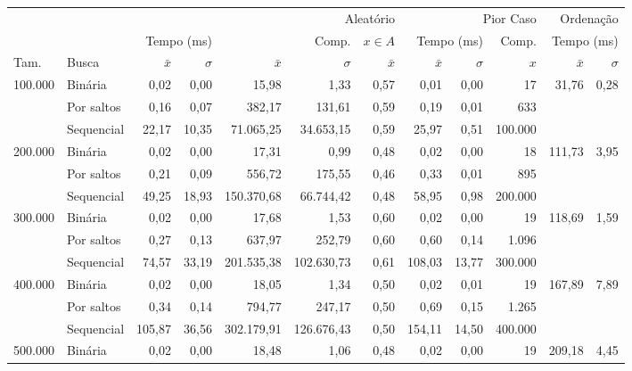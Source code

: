 \begin{tabular}{llrrrrrrrrrr}
\toprule
 &  & \multicolumn{5}{r}{Aleatório} & \multicolumn{3}{r}{Pior Caso} & \multicolumn{2}{r}{Ordenação} \\
 \cmidrule(lr){3-7} \cmidrule(lr){8-10} \cmidrule(lr){11-12}
 &  & \multicolumn{2}{r}{Tempo (ms)} & \multicolumn{2}{r}{Comp.} & $x \in A$ & \multicolumn{2}{r}{Tempo (ms)} & Comp. & \multicolumn{2}{r}{Tempo (ms)} \\
 \cmidrule(lr){3-4} \cmidrule(lr){5-6} \cmidrule(lr){7-7} \cmidrule(lr){8-9} \cmidrule(lr){10-10} \cmidrule(lr){11-12}
 Tam. & Busca & $\bar{x}$ & $\sigma$ & $\bar{x}$ & $\sigma$ & $\bar{x}$ & $\bar{x}$ & $\sigma$ & $x$ & $\bar{x}$ & $\sigma$ \\
\midrule
\multirow[c]{3}{*}{100.000} & Binária & 0,02 & 0,00 & 15,98 & 1,33 & 0,57 & 0,01 & 0,00 & 17 & \multirow[r]{3}{*}{31,76} & \multirow[r]{3}{*}{0,28} \\
 & Por saltos & 0,16 & 0,07 & 382,17 & 131,61 & 0,59 & 0,19 & 0,01 & 633 \\
 & Sequencial & 22,17 & 10,35 & 71.065,25 & 34.653,15 & 0,59 & 25,97 & 0,51 & 100.000 \\
\cline{1-12}
\multirow[c]{3}{*}{200.000} & Binária & 0,02 & 0,00 & 17,31 & 0,99 & 0,48 & 0,02 & 0,00 & 18 & \multirow[r]{3}{*}{111,73} & \multirow[r]{3}{*}{3,95} \\
 & Por saltos & 0,21 & 0,09 & 556,72 & 175,55 & 0,46 & 0,33 & 0,01 & 895 \\
 & Sequencial & 49,25 & 18,93 & 150.370,68 & 66.744,42 & 0,48 & 58,95 & 0,98 & 200.000 \\
\cline{1-12}
\multirow[c]{3}{*}{300.000} & Binária & 0,02 & 0,00 & 17,68 & 1,53 & 0,60 & 0,02 & 0,00 & 19 & \multirow[r]{3}{*}{118,69} & \multirow[r]{3}{*}{1,59} \\
 & Por saltos & 0,27 & 0,13 & 637,97 & 252,79 & 0,60 & 0,60 & 0,14 & 1.096 \\
 & Sequencial & 74,57 & 33,19 & 201.535,38 & 102.630,73 & 0,61 & 108,03 & 13,77 & 300.000 \\
\cline{1-12}
\multirow[c]{3}{*}{400.000} & Binária & 0,02 & 0,00 & 18,05 & 1,34 & 0,50 & 0,02 & 0,01 & 19 & \multirow[r]{3}{*}{167,89} & \multirow[r]{3}{*}{7,89} \\
 & Por saltos & 0,34 & 0,14 & 794,77 & 247,17 & 0,50 & 0,69 & 0,15 & 1.265 \\
 & Sequencial & 105,87 & 36,56 & 302.179,91 & 126.676,43 & 0,50 & 154,11 & 14,50 & 400.000 \\
\cline{1-12}
\multirow[c]{3}{*}{500.000} & Binária & 0,02 & 0,00 & 18,48 & 1,06 & 0,48 & 0,02 & 0,00 & 19 & \multirow[r]{3}{*}{209,18} & \multirow[r]{3}{*}{4,45} \\

\end{tabular}
